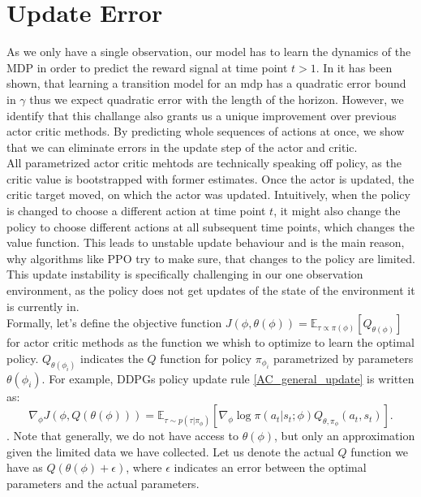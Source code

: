 \section{Update Error}
As we only have a single observation, our model has to learn the dynamics of the MDP in order to predict the reward signal at time point $t > 1$. In \cite{NEURIPS2020_b5c01503} 
it has been shown, that learning a transition model for an mdp has a quadratic error bound in $\gamma$ thus we expect quadratic error with the length of the horizon. 
However, we identify that this challange also grants us a unique improvement over previous actor critic methods. By predicting whole sequences of actions at once, 
we show that we can eliminate errors in the update step of the actor and critic.\\
All parametrized actor critic mehtods are technically speaking off policy, as the critic value is bootstrapped with former estimates. Once the actor is updated, the 
critic target moved, on which the actor was updated. Intuitively, when the policy is changed to choose a different action at time point $t$, it might also change 
the policy to choose different actions at 
all subsequent time points, which changes the value function. This leads to unstable update behaviour and is the main reason, why algorithms like PPO try to 
make sure, that changes to the policy are limited. This update instability is specifically challenging in our one observation environment, as the policy does not 
get updates of the state of the environment it is currently in. \\
Formally, let's define the objective function $J(\phi, \theta(\phi)) = \mathbb{E}_{\tau \propto \pi(\phi)}\left[Q_{\theta(\phi)}\right]$ for actor critic methods as the function we whish to optimize to learn the optimal policy. 
$Q_{\theta(\phi_i)}$ indicates the $Q$ function for policy $\pi_{\phi_{i}}$ parametrized by parameters 
$\theta(\phi_i)$. For example, DDPGs policy update rule \ref{AC_general_update} is written as:
\begin{equation}
    \nabla_{\phi} J(\phi, Q(\theta(\phi))) = \mathbb{E}_{\tau \sim p(\tau | \pi_{\phi})} \left[\nabla_{\phi} \log \pi(a_t|s_t;\phi) Q_{\theta, \pi_\phi}(a_t, s_t) \right].
\end{equation}
. Note that generally, we do not have access to $\theta(\phi)$, but only an approximation given the limited data we have collected. Let us denote the actual 
$Q$ function we have as $Q(\theta(\phi) + \epsilon)$, where $\epsilon$ indicates an error between the optimal parameters and the actual parameters.
